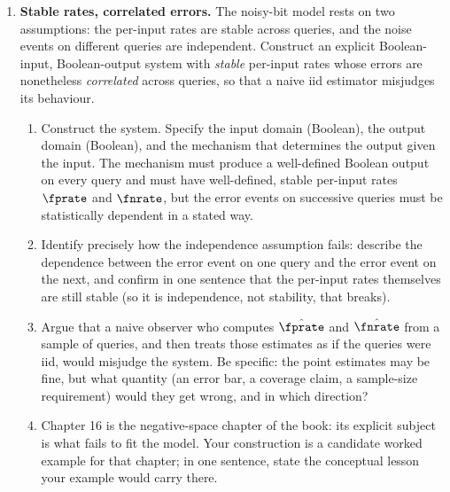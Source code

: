 \begin{enumerate}
\item \exstarstarstar
\label{ex:ch1-10}
\textbf{Stable rates, correlated errors.}
The noisy-bit model rests on two assumptions: the per-input rates are
stable across queries, and the noise events on different queries are
independent. Construct an explicit Boolean-input, Boolean-output system
with \emph{stable} per-input rates whose errors are nonetheless
\emph{correlated} across queries, so that a naive iid estimator
misjudges its behaviour.
\begin{enumerate}
  \item[(a)] Construct the system. Specify the input domain (Boolean),
    the output domain (Boolean), and the mechanism that determines the
    output given the input. The mechanism must produce a well-defined
    Boolean output on every query and must have well-defined, stable
    per-input rates $\fprate$ and $\fnrate$, but the error events on
    successive queries must be statistically dependent in a stated way.
  \item[(b)] Identify precisely how the independence assumption fails:
    describe the dependence between the error event on one query and
    the error event on the next, and confirm in one sentence that the
    per-input rates themselves are still stable (so it is independence,
    not stability, that breaks).
  \item[(c)] Argue that a naive observer who computes $\hat{\fprate}$
    and $\hat{\fnrate}$ from a sample of queries, and then treats those
    estimates as if the queries were iid, would misjudge the system. Be
    specific: the point estimates may be fine, but what quantity (an
    error bar, a coverage claim, a sample-size requirement) would they
    get wrong, and in which direction?
  \item[(d)] Chapter 16 is the negative-space chapter of the book: its
    explicit subject is what fails to fit the model. Your construction
    is a candidate worked example for that chapter; in one sentence,
    state the conceptual lesson your example would carry there.
\end{enumerate}


\end{enumerate}
